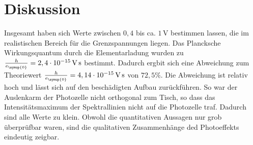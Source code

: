 \section{Diskussion}
\label{sec:Diskussion}
Insgesamt haben sich Werte zwischen $0,4$ bis ca. $1\,\unit{\volt}$ bestimmen lassen, die im realistischen
Bereich für die Grenzspannungen liegen. Das Plancksche Wirkungsquantum durch die Elementarladung wurden
zu $\frac{h}{e_{\symup{0}}}=2,4\cdot10^{-15}\,\unit{\volt\second}$ bestimmt. Dadurch ergbit sich eine Abweichung
zum Theoriewert $\frac{h}{e_{\symup{0}}}=4,14\cdot 10^{-15}\,\unit{\volt\second}$ von $72,5\%$. Die Abweichung ist
relativ hoch und lässt sich auf den beschädigten Aufbau zurückführen. So war der Auslenkarm der Photozelle nicht
orthogonal zum Tisch, so dass das Intensitätsmaximum der Spektrallinien nicht auf die Photozelle traf. Dadurch
sind alle Werte zu klein. Obwohl die quantitativen Aussagen nur grob überprüfbar waren, sind die qualitativen
Zusammenhänge ded Photoeffekts eindeutig zeigbar.